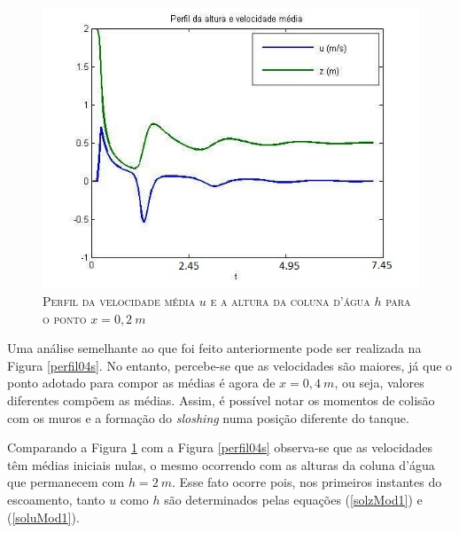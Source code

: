  \begin{figure}[H]
 	\centering
 	\includegraphics[scale=1]{figuras/perfil2s.jpg}
 	\caption{\textsc{Perfil da velocidade média $u$ e a altura da coluna d'água $h$ para o ponto $x=0,2 \ m$}}
 	\vspace{-0.1cm}
 	\label{perfil2s}
 \end{figure}
 
 Uma análise semelhante ao que foi feito anteriormente pode ser realizada na Figura \ref{perfil04s}. No entanto, percebe-se que as velocidades são maiores, já que o ponto adotado para compor as médias é agora de $x= 0,4 \ m$, ou seja, valores diferentes compõem as médias. Assim, é possível notar os momentos de colisão com os muros e a formação do \textit{sloshing} numa posição diferente do tanque.
 
 Comparando a Figura \ref{perfil2s} com a Figura \ref{perfil04s} observa-se que as velocidades têm médias iniciais nulas, o mesmo ocorrendo com as alturas da coluna d'água que permanecem com  $h=2 \ m$. Esse fato ocorre pois, nos primeiros instantes do escoamento, tanto $u$ como $h$ são determinados pelas equações (\ref{solzMod1}) e (\ref{soluMod1}). 
 
